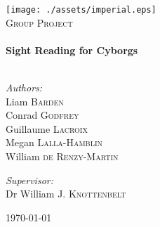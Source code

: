 \begin{titlepage}
    \begin{center}
        \texttt{[image: ./assets/imperial.eps]}~\\[1cm]
        \textsc{\LARGE Group Project} \\[0.5cm]
        \HRule \\[0.4cm]
        {\huge \bfseries Sight Reading for Cyborgs \\[0.4cm]}
        \HRule \\[1.5cm]
            \begin{flushleft}
                \large
                \emph{Authors:}\\
                Liam \textsc{Barden}\\
                Conrad \textsc{Godfrey}\\
                Guillaume \textsc{Lacroix}\\
                Megan \textsc{Lalla-Hamblin}\\
                William \textsc{de Renzy-Martin}\\
            \end{flushleft}
            \begin{flushright}
                \large
                \emph{Supervisor:}\\
                Dr William J. \textsc{Knottenbelt}
            \end{flushright}
        \vfill
        {\large \today}
    \end{center}
\end{titlepage}
